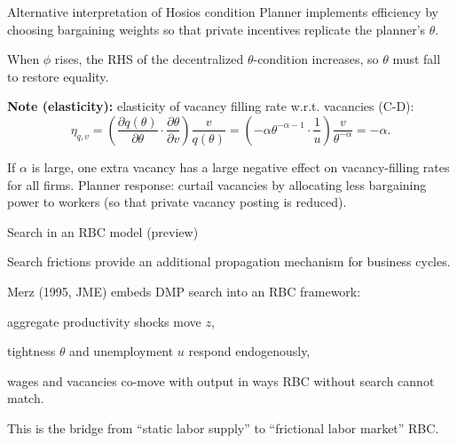 \documentclass[aspectratio=169,xcolor=dvipsnames]{beamer}
\let\tempone\itemize
\let\temptwo\enditemize
\renewenvironment{itemize}{\tempone\addtolength{\itemsep}{\fill}}{\temptwo}
\begin{document}
\begin{frame}{Alternative interpretation of Hosios condition}
\label{slide:MP_52_HosiosAlt}
\small
Planner implements efficiency by choosing bargaining weights so that private incentives replicate the planner's \(\theta\).

\medskip
When \(\phi\) rises, the RHS of the decentralized \(\theta\)-condition increases, so \(\theta\) must fall to restore equality.

\vspace{0.6em}
\textbf{Note (elasticity):} elasticity of vacancy filling rate w.r.t. vacancies (C-D):
\[
\eta_{q,v}
=
\left(\frac{\partial q(\theta)}{\partial\theta}\cdot \frac{\partial\theta}{\partial v}\right)\frac{v}{q(\theta)}
=
\left(-\alpha\theta^{-\alpha-1}\cdot\frac{1}{u}\right)\frac{v}{\theta^{-\alpha}}
=-\alpha.
\]

\medskip
If \(\alpha\) is large, one extra vacancy has a large negative effect on vacancy-filling rates for all firms.
Planner response: curtail vacancies by allocating less bargaining power to workers (so that private vacancy posting is reduced).
\end{frame}

\begin{frame}{Search in an RBC model (preview)}
\label{slide:MP_53_RBCPreview}
\small
\begin{itemize}
    \item Search frictions provide an additional propagation mechanism for business cycles.
    \item Merz (1995, JME) embeds DMP search into an RBC framework:
    \begin{itemize}
        \item aggregate productivity shocks move \(z\),
        \item tightness \(\theta\) and unemployment \(u\) respond endogenously,
        \item wages and vacancies co-move with output in ways RBC without search cannot match.
    \end{itemize}
    \item This is the bridge from ``static labor supply'' to ``frictional labor market'' RBC.
\end{itemize}
\end{frame}
\end{document}

